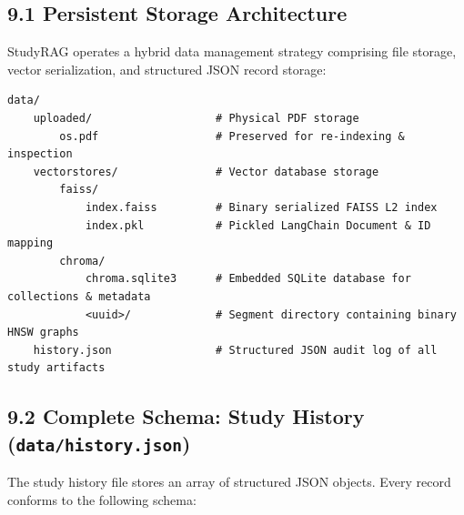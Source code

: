 \documentclass[
]{article}
\begin{document}
\subsection{9.1 Persistent Storage
Architecture}\label{persistent-storage-architecture}

StudyRAG operates a hybrid data management strategy comprising file
storage, vector serialization, and structured JSON record storage:

\begin{verbatim}
data/
    uploaded/                   # Physical PDF storage
        os.pdf                  # Preserved for re-indexing & inspection
    vectorstores/               # Vector database storage
        faiss/
            index.faiss         # Binary serialized FAISS L2 index
            index.pkl           # Pickled LangChain Document & ID mapping
        chroma/
            chroma.sqlite3      # Embedded SQLite database for collections & metadata
            <uuid>/             # Segment directory containing binary HNSW graphs
    history.json                # Structured JSON audit log of all study artifacts
\end{verbatim}

\subsection{\texorpdfstring{9.2 Complete Schema: Study History
(\texttt{data/\allowbreak history.\allowbreak json})}{9.2 Complete Schema: Study History (data/history.json)}}\label{complete-schema-study-history-datahistory.json}

The study history file stores an array of structured JSON objects. Every
record conforms to the following schema:
\end{document}
